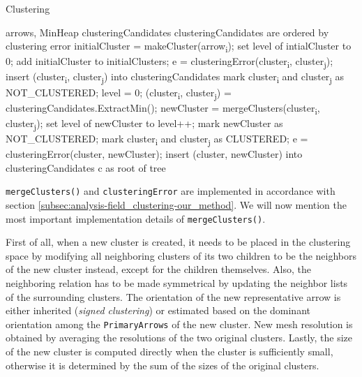 \begin{algorithm}[H]
\caption{Clustering}
\label{algo:clustering}
\begin{algorithmic}[1]

\Require arrows, MinHeap clusteringCandidates \Comment clusteringCandidates are ordered by clustering error
\Statex
{}
	\State initialCluster = makeCluster(arrow\textsubscript{i});
    \State set level of intialCluster to 0;
    \State add initialCluster to initialClusters;
\EndFor
\Statex
{}
    	\State e = clusteringError(cluster\textsubscript{i}, cluster\textsubscript{j});
        \State insert (cluster\textsubscript{i}, cluster\textsubscript{j}) into clusteringCandidates
        \State mark cluster\textsubscript{i} and cluster\textsubscript{j} as NOT\_CLUSTERED;
    \EndFor
\EndFor
\Statex
\State level = 0;
	\State (cluster\textsubscript{i}, cluster\textsubscript{j}) = clusteringCandidates.ExtractMin();
    	\State newCluster = mergeClusters(cluster\textsubscript{i}, cluster\textsubscript{j});
        \State set level of newCluster to level++;
		\State mark newCluster as NOT\_CLUSTERED;
        \State mark cluster\textsubscript{i} and cluster\textsubscript{j} as CLUSTERED;
        	\State e = clusteringError(cluster, newCluster);
            \State insert (cluster, newCluster) into clusteringCandidates
        \EndFor
    \EndIf
\EndWhile
\Statex
\Return c as root of tree
\end{algorithmic}
\end{algorithm}

\verb+mergeClusters()+ and \verb+clusteringError+ are implemented in accordance with section \ref{subsec:analysis-field_clustering-our_method}. We will now mention the most important implementation details of \verb+mergeClusters()+.

First of all, when a new cluster is created, it needs to be placed in the clustering space by modifying all neighboring clusters of its two children to be the neighbors of the new cluster instead, except for the children themselves. Also, the neighboring relation has to be made symmetrical by updating the neighbor lists of the surrounding clusters. The orientation of the new representative arrow is either inherited ({\it signed clustering}) or estimated based on the dominant orientation among the \verb+PrimaryArrows+ of the new cluster. New mesh resolution is obtained by averaging the resolutions of the two original clusters. Lastly, the size of the new cluster is computed directly when the cluster is sufficiently small, otherwise it is determined by the sum of the sizes of the original clusters.


